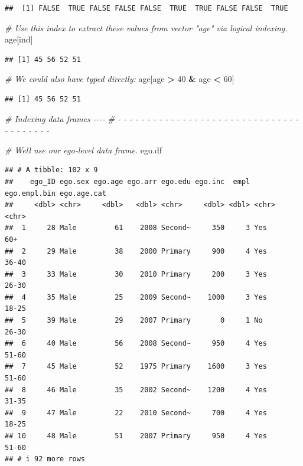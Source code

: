 \documentclass[
]{book}
\newenvironment{Shaded}{\begin{snugshade}}{\end{snugshade}}
\newcommand{\CommentTok}[1]{\textcolor[rgb]{0.56,0.35,0.01}{\textit{#1}}}
\newcommand{\DecValTok}[1]{\textcolor[rgb]{0.00,0.00,0.81}{#1}}
\newcommand{\NormalTok}[1]{#1}
\newcommand{\SpecialCharTok}[1]{\textcolor[rgb]{0.81,0.36,0.00}{\textbf{#1}}}
\begin{document}
\begin{verbatim}
##  [1] FALSE  TRUE FALSE FALSE FALSE  TRUE  TRUE FALSE FALSE  TRUE
\end{verbatim}

\begin{Shaded}
\begin{Highlighting}[]
\CommentTok{\# Use this index to extract these values from vector "age" via logical indexing.}
\NormalTok{age[ind]}
\end{Highlighting}
\end{Shaded}

\begin{verbatim}
## [1] 45 56 52 51
\end{verbatim}

\begin{Shaded}
\begin{Highlighting}[]
\CommentTok{\# We could also have typed directly:}
\NormalTok{age[age }\SpecialCharTok{\textgreater{}} \DecValTok{40} \SpecialCharTok{\&}\NormalTok{ age }\SpecialCharTok{\textless{}} \DecValTok{60}\NormalTok{]}
\end{Highlighting}
\end{Shaded}

\begin{verbatim}
## [1] 45 56 52 51
\end{verbatim}

\begin{Shaded}
\begin{Highlighting}[]
\CommentTok{\# Indexing data frames                                                     {-}{-}{-}{-} }
\CommentTok{\# {-} {-} {-} {-} {-} {-} {-} {-} {-} {-} {-} {-} {-} {-} {-} {-} {-} {-} {-} {-} {-} {-} {-} {-} {-} {-} {-} {-} {-} {-} {-} {-} {-} {-} {-} {-} {-} {-} {-} }

\CommentTok{\# We\textquotesingle{}ll use our ego{-}level data frame.}
\NormalTok{ego.df}
\end{Highlighting}
\end{Shaded}

\begin{verbatim}
## # A tibble: 102 x 9
##    ego_ID ego.sex ego.age ego.arr ego.edu ego.inc  empl ego.empl.bin ego.age.cat
##     <dbl> <chr>     <dbl>   <dbl> <chr>     <dbl> <dbl> <chr>        <chr>      
##  1     28 Male         61    2008 Second~     350     3 Yes          60+        
##  2     29 Male         38    2000 Primary     900     4 Yes          36-40      
##  3     33 Male         30    2010 Primary     200     3 Yes          26-30      
##  4     35 Male         25    2009 Second~    1000     3 Yes          18-25      
##  5     39 Male         29    2007 Primary       0     1 No           26-30      
##  6     40 Male         56    2008 Second~     950     4 Yes          51-60      
##  7     45 Male         52    1975 Primary    1600     3 Yes          51-60      
##  8     46 Male         35    2002 Second~    1200     4 Yes          31-35      
##  9     47 Male         22    2010 Second~     700     4 Yes          18-25      
## 10     48 Male         51    2007 Primary     950     4 Yes          51-60      
## # i 92 more rows
\end{verbatim}
\end{document}
